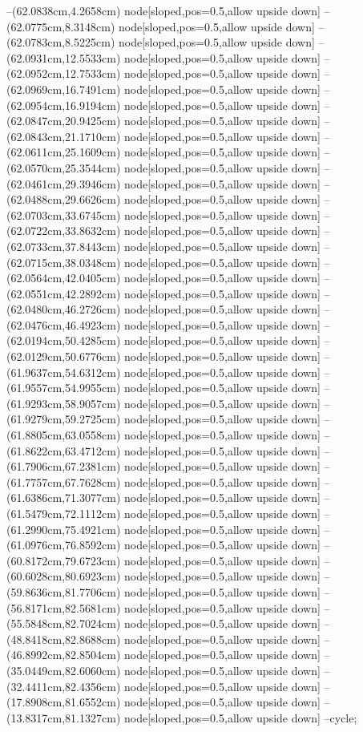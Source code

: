--(62.0838cm,4.2658cm) node[sloped,pos=0.5,allow upside down]{\arrowIn}
--(62.0775cm,8.3148cm) node[sloped,pos=0.5,allow upside down]{\ArrowIn}
--(62.0783cm,8.5225cm) node[sloped,pos=0.5,allow upside down]{\arrowIn}
--(62.0931cm,12.5533cm) node[sloped,pos=0.5,allow upside down]{\ArrowIn}
--(62.0952cm,12.7533cm) node[sloped,pos=0.5,allow upside down]{\arrowIn}
--(62.0969cm,16.7491cm) node[sloped,pos=0.5,allow upside down]{\ArrowIn}
--(62.0954cm,16.9194cm) node[sloped,pos=0.5,allow upside down]{\arrowIn}
--(62.0847cm,20.9425cm) node[sloped,pos=0.5,allow upside down]{\ArrowIn}
--(62.0843cm,21.1710cm) node[sloped,pos=0.5,allow upside down]{\arrowIn}
--(62.0611cm,25.1609cm) node[sloped,pos=0.5,allow upside down]{\ArrowIn}
--(62.0570cm,25.3544cm) node[sloped,pos=0.5,allow upside down]{\arrowIn}
--(62.0461cm,29.3946cm) node[sloped,pos=0.5,allow upside down]{\ArrowIn}
--(62.0488cm,29.6626cm) node[sloped,pos=0.5,allow upside down]{\arrowIn}
--(62.0703cm,33.6745cm) node[sloped,pos=0.5,allow upside down]{\ArrowIn}
--(62.0722cm,33.8632cm) node[sloped,pos=0.5,allow upside down]{\arrowIn}
--(62.0733cm,37.8443cm) node[sloped,pos=0.5,allow upside down]{\ArrowIn}
--(62.0715cm,38.0348cm) node[sloped,pos=0.5,allow upside down]{\arrowIn}
--(62.0564cm,42.0405cm) node[sloped,pos=0.5,allow upside down]{\ArrowIn}
--(62.0551cm,42.2892cm) node[sloped,pos=0.5,allow upside down]{\arrowIn}
--(62.0480cm,46.2726cm) node[sloped,pos=0.5,allow upside down]{\ArrowIn}
--(62.0476cm,46.4923cm) node[sloped,pos=0.5,allow upside down]{\arrowIn}
--(62.0194cm,50.4285cm) node[sloped,pos=0.5,allow upside down]{\ArrowIn}
--(62.0129cm,50.6776cm) node[sloped,pos=0.5,allow upside down]{\arrowIn}
--(61.9637cm,54.6312cm) node[sloped,pos=0.5,allow upside down]{\ArrowIn}
--(61.9557cm,54.9955cm) node[sloped,pos=0.5,allow upside down]{\arrowIn}
--(61.9293cm,58.9057cm) node[sloped,pos=0.5,allow upside down]{\ArrowIn}
--(61.9279cm,59.2725cm) node[sloped,pos=0.5,allow upside down]{\arrowIn}
--(61.8805cm,63.0558cm) node[sloped,pos=0.5,allow upside down]{\ArrowIn}
--(61.8622cm,63.4712cm) node[sloped,pos=0.5,allow upside down]{\arrowIn}
--(61.7906cm,67.2381cm) node[sloped,pos=0.5,allow upside down]{\ArrowIn}
--(61.7757cm,67.7628cm) node[sloped,pos=0.5,allow upside down]{\arrowIn}
--(61.6386cm,71.3077cm) node[sloped,pos=0.5,allow upside down]{\ArrowIn}
--(61.5479cm,72.1112cm) node[sloped,pos=0.5,allow upside down]{\arrowIn}
--(61.2990cm,75.4921cm) node[sloped,pos=0.5,allow upside down]{\ArrowIn}
--(61.0976cm,76.8592cm) node[sloped,pos=0.5,allow upside down]{\ArrowIn}
--(60.8172cm,79.6723cm) node[sloped,pos=0.5,allow upside down]{\ArrowIn}
--(60.6028cm,80.6923cm) node[sloped,pos=0.5,allow upside down]{\ArrowIn}
--(59.8636cm,81.7706cm) node[sloped,pos=0.5,allow upside down]{\ArrowIn}
--(56.8171cm,82.5681cm) node[sloped,pos=0.5,allow upside down]{\ArrowIn}
--(55.5848cm,82.7024cm) node[sloped,pos=0.5,allow upside down]{\ArrowIn}
--(48.8418cm,82.8688cm) node[sloped,pos=0.5,allow upside down]{\ArrowIn}
--(46.8992cm,82.8504cm) node[sloped,pos=0.5,allow upside down]{\ArrowIn}
--(35.0449cm,82.6060cm) node[sloped,pos=0.5,allow upside down]{\ArrowIn}
--(32.4411cm,82.4356cm) node[sloped,pos=0.5,allow upside down]{\ArrowIn}
--(17.8908cm,81.6552cm) node[sloped,pos=0.5,allow upside down]{\ArrowIn}
--(13.8317cm,81.1327cm) node[sloped,pos=0.5,allow upside down]{\ArrowIn}
--cycle;
